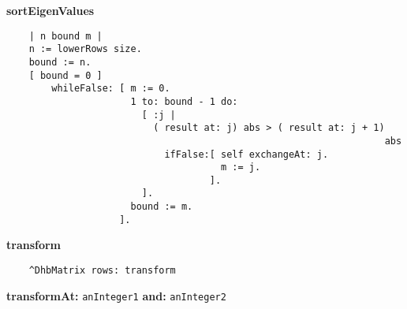 {\bf sortEigenValues}
\begin{verbatim}
    | n bound m |
    n := lowerRows size.
    bound := n.
    [ bound = 0 ]
        whileFalse: [ m := 0.
                      1 to: bound - 1 do:
                        [ :j |
                          ( result at: j) abs > ( result at: j + 1) 
                                                                   abs
                            ifFalse:[ self exchangeAt: j.
                                      m := j.
                                    ].
                        ].
                      bound := m.
                    ].

\end{verbatim}
{\bf transform}
\begin{verbatim}
    ^DhbMatrix rows: transform

\end{verbatim}
{\bf transformAt:} {\tt anInteger1} {\bf and:} {\tt anInteger2}
